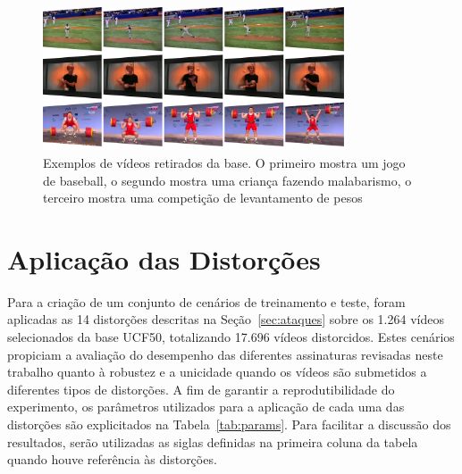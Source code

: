 \begin{figure}
    \centering
    \caption{Exemplos de vídeos retirados da base. O primeiro mostra um jogo de baseball, o segundo mostra uma criança fazendo malabarismo, o terceiro mostra uma competição de levantamento de pesos}
    \label{fig:exemplos}
    \includegraphics[width=0.8\textwidth]{dados/figuras/exemplos}
\end{figure}

\section{Aplicação das Distorções}
\label{sec:met-distorcoes}

Para a criação de um conjunto de cenários de treinamento e teste, foram aplicadas as 14 distorções descritas na Seção~\ref{sec:ataques} sobre os 1.264 vídeos selecionados da base UCF50, totalizando 17.696 vídeos distorcidos. Estes cenários propiciam a avaliação do desempenho das diferentes assinaturas revisadas neste trabalho quanto à robustez e a unicidade quando os vídeos são submetidos a diferentes tipos de distorções. A fim de garantir a reprodutibilidade do experimento, os parâmetros utilizados para a aplicação de cada uma das distorções são explicitados na Tabela~\ref{tab:params}. Para facilitar a discussão dos resultados, serão utilizadas as siglas definidas na primeira coluna da tabela quando houve referência às distorções.

